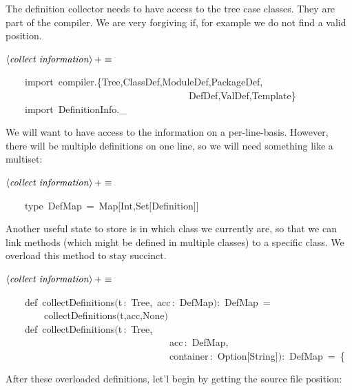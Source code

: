 \documentclass[a4paper,12pt]{article}
\begin{document}
The definition collector needs to have access to the tree case classes. They
are part of the compiler. We are very forgiving if, for example we do not find
a valid position.

$\left<\mbox{\emph{collect information}}\right>+\equiv$
\begin{program}~~~~{\vem import}~compiler.{\small\{}Tree,ClassDef,ModuleDef,PackageDef,
\\~~~~~~~~~~~~~~~~~~~~~~~~~~~~~~~~~~~~~~DefDef,ValDef,Template{\small\}}
\\~~~~{\vem import}~DefinitionInfo.\_
\\[0.5em]\end{program}


We will want to have access to the information on a per-line-basis. However,
there will be multiple definitions on one line, so we will need something like
a multiset:

$\left<\mbox{\emph{collect information}}\right>+\equiv$
\begin{program}~~~~{\vem type}~DefMap~=~Map$[$Int,Set$[$Definition$]$$]$
\\[0.5em]\end{program}


Another useful state to store is in which class we currently are, so that
we can link methods (which might be defined in multiple classes) to a specific
class. We overload this method to stay succinct.

$\left<\mbox{\emph{collect information}}\right>+\equiv$
\begin{program}~~~~{\vem def}~collectDefinitions$($t\,{\rm :}~Tree,~acc\,{\rm :}~DefMap$)${\rm :}~DefMap~=
\\~~~~~~~~collectDefinitions$($t,acc,None$)$
\\[0.5em]~~~~{\vem def}~collectDefinitions$($t\,{\rm :}~Tree,
\\~~~~~~~~~~~~~~~~~~~~~~~~~~~~~~~~~~acc\,{\rm :}~DefMap,
\\~~~~~~~~~~~~~~~~~~~~~~~~~~~~~~~~~~container\,{\rm :}~Option$[$String$]$$)${\rm :}~DefMap~=~{\small\{}
\\[0.5em]\end{program}



After these overloaded definitions, let'l begin by getting the
source file position:
\end{document}
